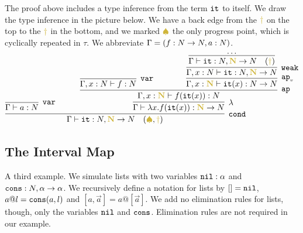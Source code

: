 \documentclass{article}
\begin{document}
The proof above includes a type inference from the term ${\tt it}$ to itself.
We draw the type inference in the picture below. 
We have a back edge from the 
$\bfColor{oldgold}{\dagger}$ on the top to the $\bfColor{oldgold}{\dagger}$ in the bottom,
and we marked $\bfColor{oldgold}{ \spadesuit}$ the only progress point, which is cyclically repeated
in $\tau$.
We abbreviate $\Gamma = (f:{N} \rightarrow {N}, a:{N})$.
\[
{
    \infer[\cond]{ %
      \Gamma 
      \vdash \iter: \N, \bfColor{oldgold}{\N} \rightarrow \N 
        \ \ \ (\bfColor{oldgold}{ \spadesuit}, \bfColor{oldgold}{\dagger})
     }{ 
         \infer[\var]{
       \Gamma 
      \vdash a:\N}{}
     &
        {\ \ \ \ \ \ }
        {\infer[\lambda] %
         {
         \Gamma
          \vdash \lambda x.f(\iter(x)):\bfColor{oldgold}{\N} \rightarrow \N
         }{
         \infer[\ap]{ %
           \Gamma, x:\bfColor{oldgold}{\N}
          \vdash f(\iter(x)):\N
           }{
          \infer[\var]{
       \Gamma, x:\N 
      \vdash f:\N}{}
           {\ \ \ \ \ \ \ \ \ \ \ \ }
           {\infer[\apvar] %
            {\Gamma, x:\bfColor{oldgold}{\N}
        \vdash \iter(x): \N \rightarrow \N 
             }{
          \infer[\weak]{\Gamma, x:\N
                                 \vdash \iter: \N, \bfColor{oldgold}{\N} \rightarrow \N}
                                {\infer[]{\Gamma
                                 \vdash \iter: \N, \bfColor{oldgold}{\N} \rightarrow \N
                                  \ \ \ (\bfColor{oldgold}{ \dagger})}{\ldots}          
             }
           }
          }
        }%
      }%
    }%
   }%
 }%
\]




\subsection{The Interval Map}
A third example. We simulate lists with two variables ${\tt nil}:\alpha$ and 
${\tt cons}:{N},\alpha \rightarrow \alpha$. We recursively define a notation for lists by $[]={\tt nil}$,
$a @ l={\tt cons}(a,l)$ and $[a,\vec{a}] = a @ [\vec{a}]$. We add no elimination rules for lists, though,
only the variables ${\tt nil}$ and ${\tt cons}$. Elimination rules are not required in our example.
\end{document}
